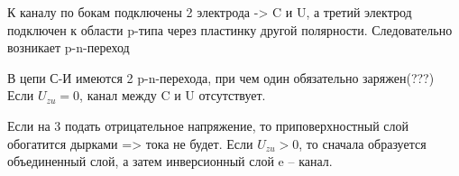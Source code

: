 \documentclass[12pt,a4paper]{article}
\begin{document}
К каналу по бокам подключены 2 электрода -> C  и U, а третий электрод подключен к области p-типа через пластинку  другой полярности. Следовательно возникает p-n-переход
\begin{center}
\begin{figure}[h!]
		\label{}
	\end{figure}
\end{center}
\begin{center}
\begin{figure}[h!]
		\label{}
	\end{figure}
\end{center}
В цепи С-И имеются 2 p-n-перехода, при чем один обязательно заряжен(???) Если $U_{zu}=0$, канал между C и  U отсутствует.

Если на 3 подать отрицательное напряжение, то приповерхностный слой обогатится дырками => тока не будет.
Если $U_{zu}>0$, то сначала образуется объединенный слой, а затем инверсионный слой e – канал.
\end{document}
